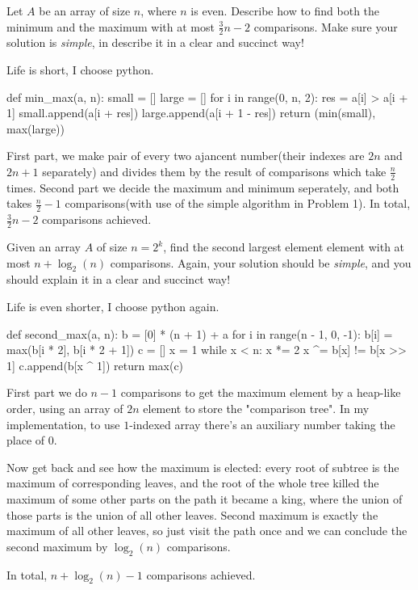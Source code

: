 \documentclass[11pt,a4paper,oneside]{article}
\begin{document}
\begin{problem}{2}
	\statement
	Let $A$ be an array of size $n$, where $n$ is even. 
	Describe how to find both the minimum and the maximum
	with at most $\frac{3}{2} n  - 2$ comparisons.
	Make sure your solution is {\em simple}, in describe it 
	in a clear and succinct way!

	\solution
	Life is short, I choose python.
\begin{python}
def min_max(a, n):
    small = []
    large = []
    for i in range(0, n, 2):
        res = a[i] > a[i + 1]
        small.append(a[i + res])
        large.append(a[i + 1 - res])
    return (min(small), max(large))
\end{python}
	First part, we make pair of every two ajancent number(their indexes are \(2n\) and \(2n + 1\) separately) and divides them by the result of comparisons which take $\frac n 2$ times.
	Second part we decide the maximum and minimum seperately, and both takes $\frac n 2 - 1$ comparisons(with use of the simple algorithm in Problem 1). In total, $\frac {3} {2} n - 2$ comparisons achieved.
\end{problem}
\begin{problem}{3}
	\statement
	Given an array $A$ of size $n = 2^k$, find the second largest element element
	with at most $n + \log_2(n)$ comparisons. 
	Again, your solution should be {\em simple}, and you should explain
	it in a clear and succinct way!
	
	\solution
	Life is even shorter, I choose python again.
\begin{python}
def second_max(a, n):
    b = [0] * (n + 1) + a
    for i in range(n - 1, 0, -1):
        b[i] = max(b[i * 2], b[i * 2 + 1])
    c = []
    x = 1
    while x < n:
        x *= 2
        x ^= b[x] != b[x >> 1]
        c.append(b[x ^ 1])
    return max(c)
\end{python}
	First part we do $n - 1$ comparisons to get the maximum element by a heap-like order, using an array of $2n$ element to store the "comparison tree". In my implementation, to use $1$-indexed array there's an auxiliary number taking the place of $0$.

	Now get back and see how the maximum is elected: every root of subtree is the maximum of corresponding leaves, and the root of the whole tree killed the maximum of some other parts on the path it became a king, where the union of those parts is the union of all other leaves. Second maximum is exactly the maximum of all other leaves, so just visit the path once and we can conclude the second maximum by $\log_2(n)$ comparisons.

	In total, $n + \log_2(n) - 1$ comparisons achieved.
\end{problem}
\end{document}
